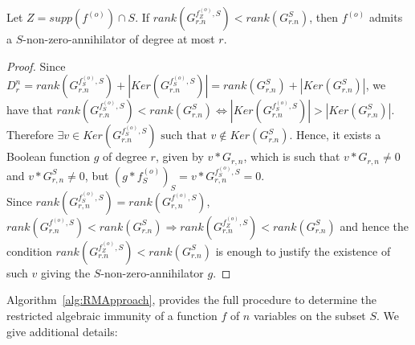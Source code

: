 \documentclass[11pt]{llncs}
\begin{document}
\begin{proposition}\label{prop:compareranks}
	Let $Z = supp\left(f^{(o)}\right) \cap S$.
	If $rank\left(G^{f_{Z}^{(o)},S}_{r.n}\right) < rank(G^{S}_{r.n})$, then $f^{(o)}$ admits a $S$-non-zero-annihilator of degree at most $r$.
\end{proposition}
\begin{proof}
	Since $D_r^n = rank(G^{f^{(o)}_S,S}_{r.n}) + |Ker(G^{f^{(o)}_S,S}_{r.n})| =  rank(G^{S}_{r.n}) + |Ker(G^{S}_{r.n})|$, we have that
	$rank(G^{f_S^{(o)},S}_{r.n}) < rank(G^{S}_{r.n}) \iff |Ker(G^{f_S^{(o)},S}_{r.n})| > |Ker(G^{S}_{r.n})|$. Therefore $\exists v\in Ker(G^{f_S^{(o)},S}_{r.n}) \mbox{ such that }v\not\in Ker(G^{S}_{r.n})$. Hence, it exists a Boolean function $g$ of degree $r$, given by $v*G_{r,n}$, which is such that $v*G_{r,n}\neq 0$ and $v*G_{r,n}^{S}\neq 0$, but $(g*f_S^{(o)})_S = v*G_{r,n}^{f_S^{(o)},S} = 0$.\\
	Since $rank\left(G_{r,n}^{f_S^{(o)}, S}\right) = rank\left(G_{r,n}^{f^{(o)}, S}\right)$, $rank(G^{f^{(o)},S}_{r.n}) < rank(G^{S}_{r.n}) \Rightarrow rank(G^{f_Z^{(o)},S}_{r.n}) < rank(G^{S}_{r.n})$ and hence the condition $rank(G^{f_Z^{(o)},S}_{r.n}) < rank(G^{S}_{r.n})$ is enough to justify the existence of such $v$ giving the $S$-non-zero-annihilator $g$.
\end{proof}

Algorithm~\ref{alg:RMApproach}, provides the full procedure to determine the restricted algebraic immunity of a function $f$ of $n$ variables on the subset $S$. We give additional details:
\end{document}
